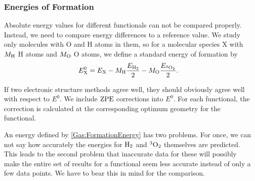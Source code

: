 \subsubsection{Energies of Formation}
\label{Sec:Gas:Energy}
Absolute energy values for different functionals can not be compared
properly. Instead, we need to compare energy differences to
a reference value. We study only molecules with O and H atoms
in them, so for a molecular species X with $M_{\text{H}}$ H atoms and 
$M_{\text O}$ O atoms, we define a standard energy of formation
by
\begin{equation}
E^0_{\text X}=E_{\text X} - M_{\text H} \frac {E_{\text H_2}} 2 - M_{\text O} \frac {E_{{^3\text O_2}}} 2.
\label{Gas:FormationEnergy} 
\end{equation}

If two electronic
structure methods agree well, they should obviously agree well with respect to
$E^0$.
We include $\text{ZPE}$ corrections into $E^0$. For each functional, 
the correction is calculated at the corresponding optimum geometry
for the functional. 

An energy defined by \eqref{Gas:FormationEnergy} has two problems. For
once, we can not say how accurately the energies for $\text H_2$ and ${^3\text O_2}$
themselves are predicted. This leads to the second problem that inaccurate
data for these will possibly make the entire set of results for a functional
seem less accurate instead of only a few data points. We have to bear this in
mind for the comparison. 

